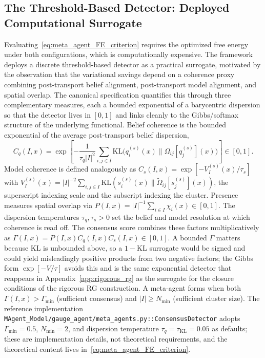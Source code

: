 \documentclass[11pt]{article}
\begin{document}
\subsection{The Threshold-Based Detector: Deployed Computational Surrogate}
\label{sec:meta_agent_threshold}

Evaluating~\eqref{eq:meta_agent_FE_criterion} requires the optimized free energy under both configurations, which is computationally expensive. The framework deploys a discrete threshold-based detector as a practical surrogate, motivated by the observation that the variational savings depend on a coherence proxy combining post-transport belief alignment, post-transport model alignment, and spatial overlap. The canonical specification quantifies this through three complementary measures, each a bounded exponential of a barycentric dispersion so that the detector lives in $[0, 1]$ and links cleanly to the Gibbs/softmax structure of the underlying functional. Belief coherence is the bounded exponential of the average post-transport belief dispersion,
\begin{equation}
C_q(I, x) = \exp\left[-\frac{1}{\tau_q |I|^2}\sum_{i,j \in I} \mathrm{KL}\big(q_i^{(s)}(x) \| \Omega_{ij}[q_j^{(s)}](x)\big)\right] \in [0, 1].
\end{equation}
Model coherence is defined analogously as $C_s(I, x) = \exp[-V^{(s)}_I(x)/\tau_s]$ with $V^{(s)}_I(x) = |I|^{-2}\sum_{i,j \in I} \mathrm{KL}(s_i^{(s)}(x) \| \tilde{\Omega}_{ij}[s_j^{(s)}](x))$, the superscript indexing scale and the subscript indexing the cluster. Presence measures spatial overlap via $P(I, x) = |I|^{-1}\sum_{i \in I} \chi_i(x) \in [0, 1]$. The dispersion temperatures $\tau_q, \tau_s > 0$ set the belief and model resolution at which coherence is read off. The consensus score combines these factors multiplicatively as $\Gamma(I, x) = P(I, x) C_q(I, x) C_s(I, x) \in [0, 1]$. A bounded $\Gamma$ matters because $\mathrm{KL}$ is unbounded above, so a $1 - \mathrm{KL}$ surrogate would be signed and could yield misleadingly positive products from two negative factors; the Gibbs form $\exp[-V/\tau]$ avoids this and is the same exponential detector that reappears in Appendix~\ref{app:rigorous_rg} as the surrogate for the closure conditions of the rigorous RG construction. A meta-agent forms when both $\Gamma(I, x) > \Gamma_{\min}$ (sufficient consensus) and $|I| \geq N_{\min}$ (sufficient cluster size). The reference implementation \texttt{MAgent\_Model/gauge\_agent/meta\_agents.py::ConsensusDetector} adopts $\Gamma_{\min} = 0.5$, $N_{\min} = 2$, and dispersion temperature $\tau_q = \tau_{\mathrm{KL}} = 0.05$ as defaults; these are implementation details, not theoretical requirements, and the theoretical content lives in~\eqref{eq:meta_agent_FE_criterion}.
\end{document}
